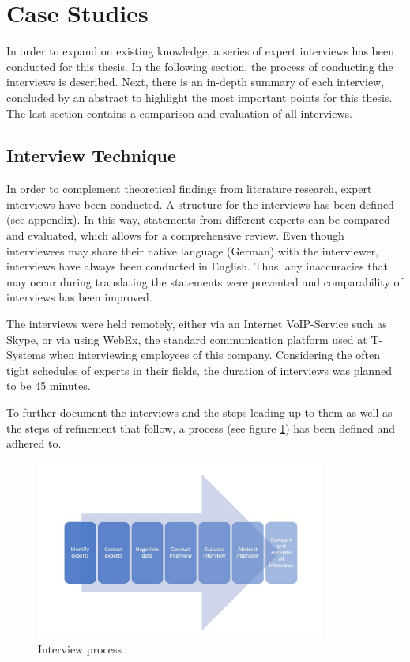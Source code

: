 
\section{Case Studies}

In order to expand on existing knowledge, a series of expert interviews has been conducted for this thesis. In the following section, the process of conducting the interviews is described. Next, there is an in-depth summary of each interview, concluded by an abstract to highlight the most important points for this thesis. The last section contains a comparison and evaluation of all interviews.

\subsection{Interview Technique}
In order to complement theoretical findings from literature research, expert interviews have been conducted. A structure for the interviews has been defined (see appendix). In this way, statements from different experts can be compared and evaluated, which allows for a comprehensive review. Even though interviewees may share their native language (German) with the interviewer, interviews have always been conducted in English. Thus, any inaccuracies that may occur during translating the statements were prevented and comparability of interviews has been improved.

The interviews were held remotely, either via an Internet VoIP-Service such as Skype, or via using WebEx, the standard communication platform used at T-Systems when interviewing employees of this company. Considering the often tight schedules of experts in their fields, the duration of interviews was planned to be 45 minutes.

To further document the interviews and the steps leading up to them as well as the steps of refinement that follow, a process (see figure \ref{fig:Intprocess}) has been defined and adhered to. 

\vspace{3mm}
\begin{figure}[htb]
	\centering
	\includegraphics[width=0.85\textwidth]{Pictures/Interview_process}
	\caption{Interview process}
	\label{fig:Intprocess}
\end{figure}

